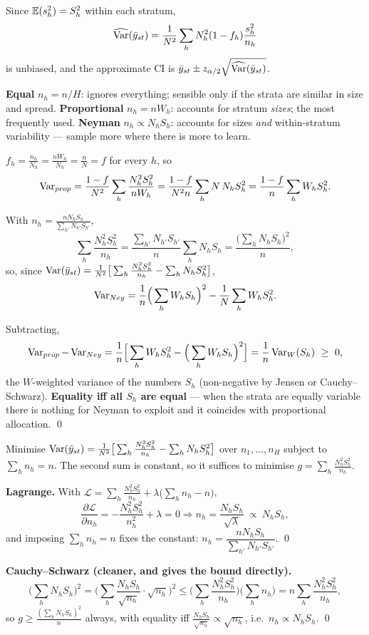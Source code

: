  Since $\mathbb{E}(s_h^2)=S_h^2$ within each stratum,
\[
  \widehat{\operatorname{Var}}(\bar{y}_{st})=\frac1{N^2}\sum_hN_h^2(1-f_h)\frac{s_h^2}{n_h}
\]
is unbiased, and the approximate CI is
$\bar{y}_{st}\pm z_{\alpha/2}\sqrt{\widehat{\operatorname{Var}}(\bar{y}_{st})}$.

 \textbf{Equal} $n_h=n/H$: ignores everything; sensible only if the strata are similar in
size and spread. \textbf{Proportional} $n_h=nW_h$: accounts for stratum \emph{sizes}; the most
frequently used. \textbf{Neyman} $n_h\propto N_hS_h$: accounts for sizes \emph{and} within-stratum
variability --- sample more where there is more to learn.

 $f_h=\frac{n_h}{N_h}=\frac{nW_h}{N_h}=\frac{n}{N}=f$ for every $h$, so
\[
  \operatorname{Var}_{prop}=\frac{1-f}{N^2}\sum_h\frac{N_h^2S_h^2}{nW_h}
  =\frac{1-f}{N^2n}\sum_hN\,N_hS_h^2=\frac{1-f}{n}\sum_hW_hS_h^2 .
\]

 With $n_h=\frac{nN_hS_h}{\sum_{h'}N_{h'}S_{h'}}$,
\[
  \sum_h\frac{N_h^2S_h^2}{n_h}=\frac{\sum_{h'}N_{h'}S_{h'}}{n}\sum_hN_hS_h=\frac{\big(\sum_hN_hS_h\big)^2}{n},
\]
so, since $\operatorname{Var}(\bar{y}_{st})=\frac1{N^2}\big[\sum_h\frac{N_h^2S_h^2}{n_h}-\sum_hN_hS_h^2\big]$,
\[
  \operatorname{Var}_{Ney}=\frac{1}{n}\Big(\sum_hW_hS_h\Big)^2-\frac1N\sum_hW_hS_h^2 .
\]

 Subtracting,
\[
  \operatorname{Var}_{prop}-\operatorname{Var}_{Ney}=\frac1n\Big[\sum_hW_hS_h^2-\Big(\sum_hW_hS_h\Big)^2\Big]
  =\frac1n\operatorname{Var}_W(S_h)\ \ge\ 0,
\]
the $W$-weighted variance of the numbers $S_h$ (non-negative by Jensen or Cauchy--Schwarz).
\textbf{Equality iff all $S_h$ are equal} --- when the strata are equally variable there is
nothing for Neyman to exploit and it coincides with proportional allocation. \qed

\sol Minimise $\operatorname{Var}(\bar{y}_{st})=\frac1{N^2}\big[\sum_h\frac{N_h^2S_h^2}{n_h}-\sum_hN_hS_h^2\big]$
over $n_1,\dots,n_H$ subject to $\sum_hn_h=n$. The second sum is constant, so it suffices to
minimise $g=\sum_h\frac{N_h^2S_h^2}{n_h}$.

\textbf{Lagrange.} With $\mathcal L=\sum_h\frac{N_h^2S_h^2}{n_h}+\lambda\big(\sum_hn_h-n\big)$,
\[
  \frac{\partial\mathcal L}{\partial n_h}=-\frac{N_h^2S_h^2}{n_h^2}+\lambda=0
  \Longrightarrow n_h=\frac{N_hS_h}{\sqrt\lambda}\ \propto\ N_hS_h ,
\]
and imposing $\sum_hn_h=n$ fixes the constant:
$n_h=\dfrac{nN_hS_h}{\sum_{h'}N_{h'}S_{h'}}$. \qed

\textbf{Cauchy--Schwarz (cleaner, and gives the bound directly).}
\[
  \Big(\sum_hN_hS_h\Big)^2=\Big(\sum_h\frac{N_hS_h}{\sqrt{n_h}}\cdot\sqrt{n_h}\Big)^2
  \le\Big(\sum_h\frac{N_h^2S_h^2}{n_h}\Big)\Big(\sum_hn_h\Big)
  =n\sum_h\frac{N_h^2S_h^2}{n_h},
\]
so $g\ge\frac{(\sum_hN_hS_h)^2}{n}$ always, with equality iff
$\frac{N_hS_h}{\sqrt{n_h}}\propto\sqrt{n_h}$, i.e.\ $n_h\propto N_hS_h$. \qed

